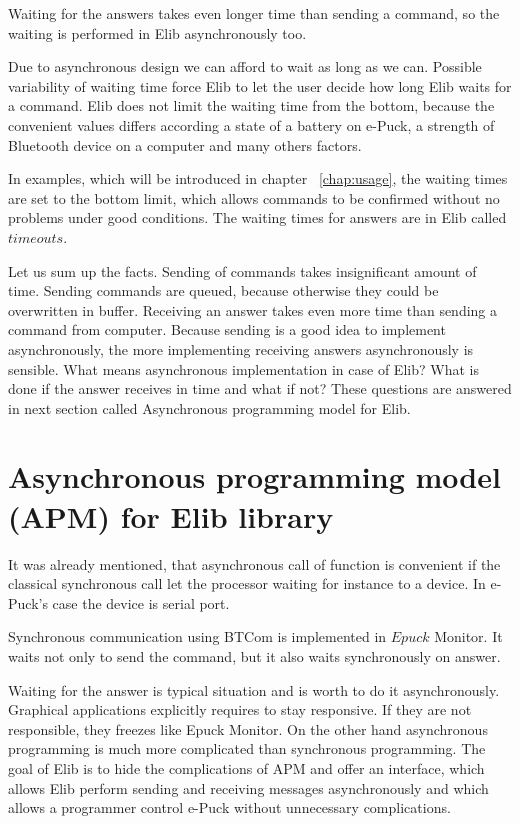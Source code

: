 	Waiting for the answers takes even longer time than sending a command,
	so the waiting is performed in Elib asynchronously too.
	 
	Due to asynchronous design we can afford to wait as long as we can. 
	Possible variability of waiting time force Elib to let the user decide how long
	 Elib waits for a command. Elib does not limit the waiting time from the bottom,
	because the convenient values differs according a state of a battery on e-Puck, a strength of Bluetooth device
	on a computer and many others factors. 
	
	In examples, which will be introduced in chapter ~\ref{chap:usage}, the waiting times are set to the bottom limit,
	which allows commands to be confirmed without no problems under good conditions.
	The waiting times for answers are in Elib called $timeouts$.
	 
	Let us sum up the facts. Sending of commands takes insignificant amount of time.
	Sending commands are queued, because otherwise they could be overwritten in buffer.
	Receiving an answer takes even more time than sending a command from computer.
	Because sending is a good idea to implement asynchronously, the more implementing receiving
	answers asynchronously is sensible.
	What means asynchronous implementation in case of Elib? What is done if the answer receives in time
	and what if not? These questions are answered in next section called Asynchronous programming model for Elib.
\section{ Asynchronous programming model (APM) for Elib library}\label{sec:apm}
	It was already mentioned, that asynchronous call of function is convenient if the
	classical synchronous call let the processor waiting for instance to a device.
	In e-Puck's case the device is serial port. 
	 
	Synchronous communication using BTCom 
	is implemented in $Epuck$ Monitor.\cite{monitor} It waits not only to send the command, but
	it also waits synchronously on answer.
	 
	Waiting for the answer is typical situation and is worth to do it asynchronously. Graphical 
	applications explicitly requires to stay responsive. If they are not responsible, they freezes like Epuck Monitor.
	On the other hand asynchronous programming is much more complicated than synchronous programming.
	The goal of Elib is to hide the complications of APM and offer an interface,
	which allows Elib perform sending and receiving messages asynchronously and
	which allows a programmer control e-Puck without unnecessary complications.
	 
